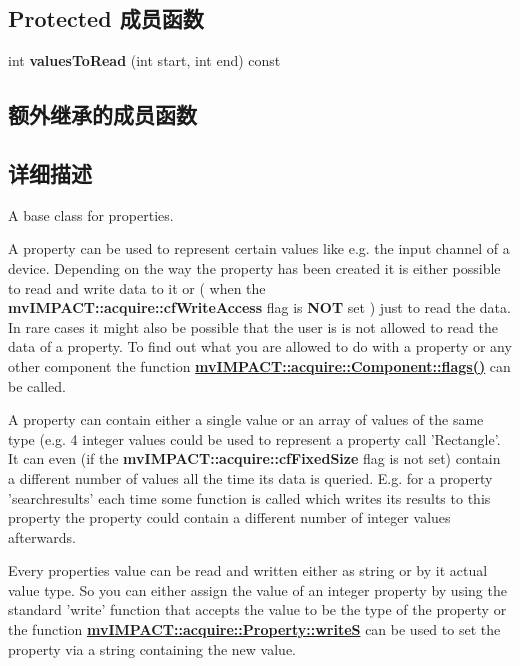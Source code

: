 \subsection*{Protected 成员函数}
\begin{DoxyCompactItemize}
\item 
\hypertarget{classmv_i_m_p_a_c_t_1_1acquire_1_1_property_a0fd0bbda8c9b678debc2b5e2eac0610d}{int {\bfseries values\+To\+Read} (int start, int end) const }\label{classmv_i_m_p_a_c_t_1_1acquire_1_1_property_a0fd0bbda8c9b678debc2b5e2eac0610d}

\end{DoxyCompactItemize}
\subsection*{额外继承的成员函数}


\subsection{详细描述}
A base class for properties. 

A property can be used to represent certain values like e.\+g. the input channel of a device. Depending on the way the property has been created it is either possible to read and write data to it or ( when the {\bfseries mv\+I\+M\+P\+A\+C\+T\+::acquire\+::cf\+Write\+Access} flag is {\bfseries N\+O\+T} set ) just to read the data. In rare cases it might also be possible that the user is is not allowed to read the data of a property. To find out what you are allowed to do with a property or any other component the function {\bfseries \hyperlink{classmv_i_m_p_a_c_t_1_1acquire_1_1_component_a92f9a75ca9a56430e172c00b29b5496f}{mv\+I\+M\+P\+A\+C\+T\+::acquire\+::\+Component\+::flags()}} can be called.

A property can contain either a single value or an array of values of the same type (e.\+g. 4 integer values could be used to represent a property call 'Rectangle'. It can even (if the {\bfseries mv\+I\+M\+P\+A\+C\+T\+::acquire\+::cf\+Fixed\+Size} flag is not set) contain a different number of values all the time its data is queried. E.\+g. for a property 'searchresults' each time some function is called which writes its results to this property the property could contain a different number of integer values afterwards.

Every properties value can be read and written either as string or by it actual value type. So you can either assign the value of an integer property by using the standard 'write' function that accepts the value to be the type of the property or the function {\bfseries \hyperlink{classmv_i_m_p_a_c_t_1_1acquire_1_1_property_a51893d14c0fc6128bc9f4cc0ba5a7e5d}{mv\+I\+M\+P\+A\+C\+T\+::acquire\+::\+Property\+::write\+S}} can be used to set the property via a string containing the new value.

